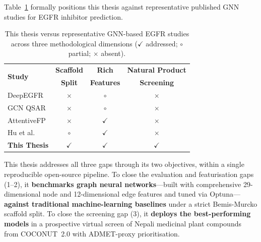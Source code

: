 \noindent Table~\ref{tab:gap_compare} formally positions this thesis against
representative published GNN studies for EGFR inhibitor prediction.

\begin{table}[H]
\centering
\caption{This thesis versus representative GNN-based EGFR studies across three methodological dimensions ($\checkmark$ addressed; $\circ$ partial; $\times$ absent).}
\label{tab:gap_compare}
{\singlespacing
\begin{tabular}{lccc}
\toprule
\multirow{2}{*}{\textbf{Study}} &
\textbf{Scaffold} & \textbf{Rich} & \textbf{Natural Product} \\
& \textbf{Split} & \textbf{Features} & \textbf{Screening} \\
\midrule
DeepEGFR \parencite{malik2025deepegfr}      & $\times$ & $\circ$ & $\times$ \\
GCN QSAR \parencite{jiang2021gnn}           & $\times$ & $\circ$ & $\times$ \\
AttentiveFP \parencite{xiong2020attentivefp} & $\times$ & $\checkmark$ & $\times$ \\
Hu et al. \parencite{hu2020strategies}      & $\circ$  & $\checkmark$ & $\times$ \\
\textbf{This Thesis}                        & $\checkmark$ & $\checkmark$ & $\checkmark$ \\
\bottomrule
\end{tabular}
}
\end{table}

This thesis addresses all three gaps through its two objectives, within a single
reproducible open-source pipeline. To close the evaluation and featurisation gaps
(1--2), it \textbf{benchmarks graph neural networks}---built with comprehensive
29-dimensional node and 12-dimensional edge features and tuned via Optuna---%
\textbf{against traditional machine-learning baselines} under a strict Bemis-Murcko
scaffold split. To close the screening gap (3), it \textbf{deploys the best-performing
models} in a prospective virtual screen of Nepali medicinal plant compounds from
COCONUT~2.0 with ADMET-proxy prioritisation.